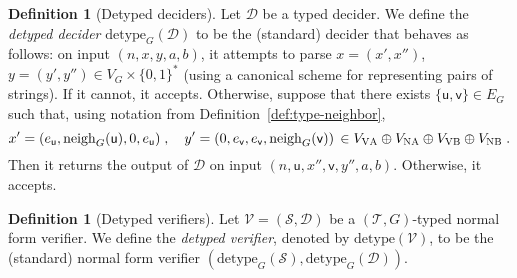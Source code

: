 \documentclass[11pt]{article}
\theoremstyle{definition}
\newtheorem{definition}[theorem]{Definition}
\newcommand{\sampler}{\mathcal{S}}
\newcommand{\decider}{\mathcal{D}}
\newcommand{\verifier}{\mathcal{V}}
\newcommand{\detype}{\mathrm{detype}}
\newcommand{\type}{\mathcal{T}}
\newcommand{\labelstyle}[1]{\ensuremath{\textsc{#1}}\xspace}
\newcommand{\vertex}[1]{\labelstyle{V#1}}
\newcommand{\edge}[1]{\labelstyle{N#1}}
\newcommand{\tvarstyle}[1]{\mathsf{#1}}
\newcommand{\lvar}{\ensuremath{\tvarstyle{u}}}
\newcommand{\rvar}{\ensuremath{\tvarstyle{v}}}
\newcommand{\alice}{\labelstyle{A}}
\newcommand{\bob}{\labelstyle{B}}
\begin{document}
\begin{definition}[Detyped deciders]
  Let $\decider$ be a typed decider.
  We define the \emph{detyped decider} $\detype_G(\decider)$ to be the
  (standard) decider that behaves as follows: on input $(n,x,y,a,b)$, it
  attempts to parse $x = (x', x'')$, $y =(y', y'') \in V_G \times \{0,1\}^*$
  (using a canonical scheme for representing pairs of strings).
  If it cannot, it accepts.
  Otherwise, suppose that there exists $\{\lvar, \rvar\} \in E_G$ such that,
  using notation from Definition~\ref{def:type-neighbor},
  \begin{equation*}
    x' = (e_\lvar, \mathrm{neigh}_G(\lvar), 0, e_\lvar)\;,\quad
    y' = (0, e_\rvar, e_\rvar, \mathrm{neigh}_G(\rvar))
    \, \in V_{\vertex{\alice}} \oplus V_{\edge{\alice}}
    \oplus V_{\vertex{\bob}} \oplus V_{\edge{\bob}}\;.
  \end{equation*}
  Then it returns the output of $\decider$ on input $(n, \lvar, x'', \rvar, y'',
  a, b)$.
  Otherwise, it accepts.
\end{definition}

\begin{definition}[Detyped verifiers]
\label{def:detyped-verifier}
  Let $\verifier = (\sampler, \decider)$ be a $(\type, G)$-typed normal form
  verifier.
  We define the \emph{detyped verifier}, denoted by $\detype(\verifier)$, to be
  the (standard) normal form verifier
  $(\detype_G(\sampler), \detype_G(\decider))$.
\end{definition}
\end{document}
